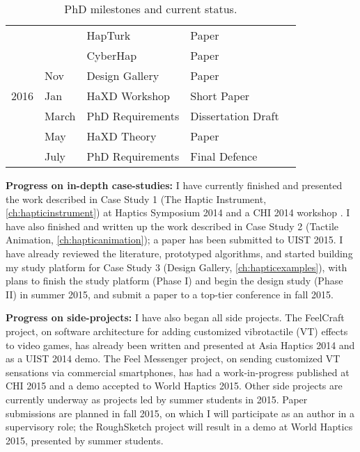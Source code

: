 \begin{table}[htbp]
\begin{tabular}{@{} lllll @{}}
	&
      	&  \MilestoneSideProject HapTurk
	& Paper
	& \MilestoneInProgress
	\\
	
	&
      	&  \MilestoneSideProject CyberHap
	& Paper
	& \MilestoneInProgress
	\\
	
	& Nov
     	&  Design Gallery
	& Paper
	& \MilestonePlanned %
	\\
	
	2016 & Jan
      	&  HaXD Workshop
	& Short Paper
	& \MilestonePlanned
	\\
	
	 & March
      	&  PhD Requirements
	& Dissertation Draft
	& \MilestonePlanned
	\\
	
	 & May
      	&  HaXD Theory
	& Paper
	& \MilestonePlanned
	\\

	 & July
      	&  PhD Requirements
	& Final Defence
	& \MilestonePlanned
	\\
	
	
      
      \bottomrule
   \end{tabular}
   \caption{PhD milestones and current status.}
   \label{tab:timeline:milestones}
\end{table}


\textbf{Progress on in-depth case-studies:}
I have currently finished and presented the work described in Case Study 1 (The Haptic Instrument, \autoref{ch:hapticinstrument}) at Haptics Symposium 2014 \cite{Schneider2014} and a CHI 2014 workshop \cite{Schneider2014b}.
I have also finished and written up the work described in Case Study 2 (Tactile Animation, \autoref{ch:hapticanimation}); a paper has been submitted to UIST 2015.
I have already reviewed the literature, prototyped algorithms, and started building my study platform for Case Study 3 (Design Gallery, \autoref{ch:hapticexamples}), with plans to finish the study platform (Phase I) and begin the design study (Phase II) in summer 2015, and submit a paper to a top-tier conference in fall 2015.

\textbf{Progress on side-projects:}
I have also began all side projects.
The FeelCraft project, on software architecture for adding customized vibrotactile (VT) effects to video games, has already been written and presented at Asia Haptics 2014 \cite{SchneiderAsiaHaptics2014} and as a UIST 2014 demo.
The Feel Messenger project, on sending customized VT sensations via commercial smartphones, has had a work-in-progress published at CHI 2015 \cite{Israr2015} and a demo accepted to World Haptics 2015.
Other side projects are currently underway as projects led by summer students in 2015. Paper submissions are planned in fall 2015, on which I will participate as an author in a supervisory role; the RoughSketch project will result in a demo at World Haptics 2015, presented by summer students.

